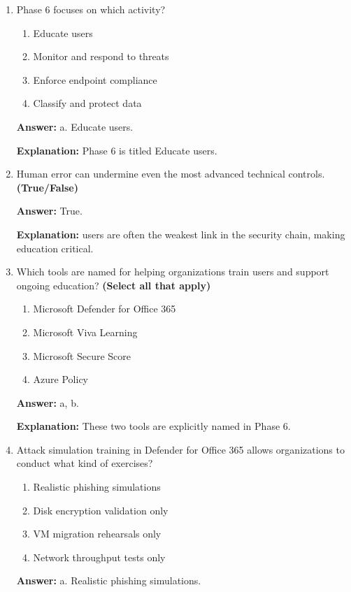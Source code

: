\documentclass[10pt]{article}
\begin{document}
\begin{enumerate}[leftmargin=*]
\textbf{Explanation:} These are the exact examples given for attackers' ultimate goals.

\item Phase 6 focuses on which activity?
\begin{enumerate}[label=\alph*., leftmargin=1.5em]
\item Educate users
\item Monitor and respond to threats
\item Enforce endpoint compliance
\item Classify and protect data
\end{enumerate}
\textbf{Answer:} a. Educate users.

\textbf{Explanation:} Phase 6 is titled Educate users.

\item Human error can undermine even the most advanced technical controls. \textbf{(True/False)}

\textbf{Answer:} True.

\textbf{Explanation:} users are often the weakest link in the security chain, making education critical.

\item Which tools are named for helping organizations train users and support ongoing education? \textbf{(Select all that apply)}
\begin{enumerate}[label=\alph*., leftmargin=1.5em]
\item Microsoft Defender for Office 365
\item Microsoft Viva Learning
\item Microsoft Secure Score
\item Azure Policy
\end{enumerate}
\textbf{Answer:} a, b.

\textbf{Explanation:} These two tools are explicitly named in Phase 6.

\item Attack simulation training in Defender for Office 365 allows organizations to conduct what kind of exercises?
\begin{enumerate}[label=\alph*., leftmargin=1.5em]
\item Realistic phishing simulations
\item Disk encryption validation only
\item VM migration rehearsals only
\item Network throughput tests only
\end{enumerate}
\textbf{Answer:} a. Realistic phishing simulations.


\end{enumerate}
\end{document}
